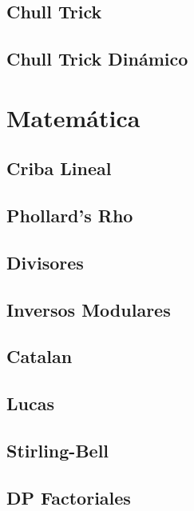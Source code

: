 \documentclass[a4paper,11pt,landscape,twocolumn]{article}
\begin{document}
\subsection{Chull Trick}

\subsection{Chull Trick Dinámico}


\section{Matemática} %
\subsection{Criba Lineal}

\subsection{Phollard's Rho}

\subsection{Divisores}

\subsection{Inversos Modulares}


\subsection{Catalan}

\subsection{Lucas}

\subsection{Stirling-Bell}

\subsection{DP Factoriales}

\end{document}
